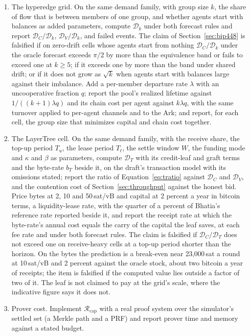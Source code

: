\documentclass[11pt]{article}
\theoremstyle{plain}
\theoremstyle{definition}
\theoremstyle{remark}
\newcommand{\Dur}{\mathcal{D}}
\newcommand{\Rcap}{\mathcal{R}_{\mathrm{cap}}}
\begin{document}
\begin{enumerate}[leftmargin=*,itemsep=2pt]
\item The hyperedge grid. On the same demand family, with group size $k$, the share of flow that is between members of one group, and whether agents start with balances as added parameters, compute $\Dur_k$ under both forecast rules and report $\Dur_C/\Dur_k$, $\Dur_V/\Dur_k$, and failed events. The claim of Section~\ref{sec:bip448} is falsified if on zero-drift cells whose agents start from nothing $\Dur_C/\Dur_k$ under the oracle forecast exceeds $\pi/2$ by more than the equivalence band or fails to exceed one at $k\ge 5$; if it exceeds one by more than the band under shared drift; or if it does not grow as $\sqrt k$ when agents start with balances large against their imbalance. Add a per-member departure rate $\lambda$ with an uncooperative fraction $q$; report the pool's realized lifetime against $1/((k+1)\lambda q)$ and its chain cost per agent against $k\lambda q$, with the same turnover applied to per-agent channels and to the Ark; and report, for each cell, the group size that minimizes capital and chain cost together.
\item The LayerTree cell. On the same demand family, with the receive share, the top-up period $T_u$, the lease period $T_\ell$, the settle window $W$, the funding mode and $\kappa$ and $\beta$ as parameters, compute $\Dur_T$ with its credit-leaf and graft terms and the byte-rate $b_T$ beside it, on the draft's transaction model with its omissions stated; report the ratio of Equation~\eqref{eq:tratio} against $\Dur_C$ and $\Dur_V$, and the contention cost of Section~\ref{sec:throughput} against the honest bid. Price bytes at 2, 10 and 50\,sat/vB and capital at 2 percent a year in bitcoin terms, a liquidity-lease rate, with the quarter of a percent of Bhatia's reference rate reported beside it, and report the receipt rate at which the byte-rate's annual cost equals the carry of the capital the leaf saves, at each fee rate and under both forecast rules. The claim is falsified if $\Dur_C/\Dur_T$ does not exceed one on receive-heavy cells at a top-up period shorter than the horizon. On the bytes the prediction is a break-even near 23{,}000\,sat a round at 10\,sat/vB and 2 percent against the oracle stock, about two bitcoin a year of receipts; the item is falsified if the computed value lies outside a factor of two of it. The leaf is not claimed to pay at the grid's scale, where the indicative figure says it does not.
\item Prover cost. Implement $\Rcap$ with a real proof system over the simulator's settled set (a Merkle path and a PRF) and report prover time and memory against a stated budget.

\end{enumerate}
\end{document}

